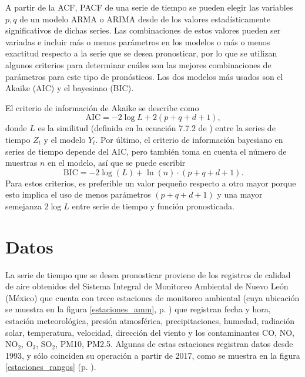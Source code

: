 \documentclass{elsarticle}
\begin{document}
A partir de la ACF, PACF de una serie de tiempo se pueden elegir las variables $p, q$ de un modelo ARMA o ARIMA desde de los valores estadísticamente significativos de dichas series. Las combinaciones de estos valores pueden ser variadas e incluir más o menos parámetros en los modelos o más o menos exactitud respecto a la serie que se desea pronosticar, por lo que se utilizan algunos criterios para determinar cuáles son las mejores combinaciones de parámetros para este tipo de pronósticos. Los dos modelos más usados son el Akaike (AIC) y el bayesiano (BIC).

El criterio de información de Akaike se describe como
\begin{equation}
\mbox{AIC} = -2 \log{L} + 2 (p + q + d + 1),
\end{equation}
donde $L$ es la similitud (definida en la ecuación 7.7.2 de \cite{Hyndman2018}) entre la series de tiempo $Z_t$ y el modelo $Y_t$. Por último, el criterio de información bayesiano \cite{Albert2007} en series de tiempo depende del AIC, pero también toma en cuenta el número de muestras $n$ en el modelo, así que se puede escribir
\begin{equation}
    \mbox{BIC} = -2 \log(L) + \ln(n) \cdot (p + q + d + 1).
\end{equation}
Para estos criterios, es preferible un valor pequeño respecto a otro mayor porque esto implica el uso de menos parámetros $(p + q + d + 1)$ y una mayor semejanza $2\log{L}$ entre serie de tiempo y función pronosticada.

\section{Datos}
\label{datos}

La serie de tiempo que se desea pronosticar proviene de los registros de calidad de aire obtenidos del Sistema Integral de Monitoreo Ambiental de Nuevo León (México) \cite{aireNL} que cuenta con trece estaciones de monitoreo ambiental (cuya ubicación se muestra en la figura \ref{estaciones_amm}, p. \pageref{estaciones_amm}) que registran fecha y hora, estación meteorológica, presión atmosférica, precipitaciones, humedad, radiación solar, temperatura, velocidad, dirección del viento y los contaminantes CO, NO, NO$_2$, O$_3$, SO$_2$, PM10, PM2.5. Algunas de estas estaciones registran datos desde 1993, y sólo coinciden su operación a partir de 2017, como se muestra en la figura \ref{estaciones_rangos} (p. \pageref{estaciones_rangos}). 
\end{document}

